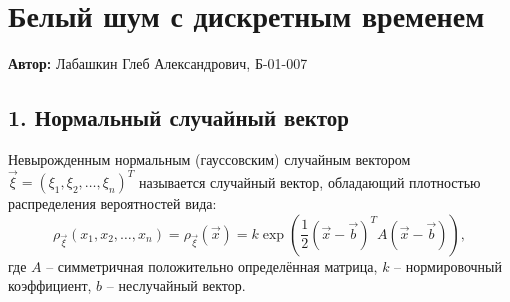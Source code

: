 
\section{Белый шум с дискретным временем}	

\textbf{Автор:} Лабашкин Глеб Александрович, Б-01-007

\subsection*{1. Нормальный случайный вектор} 

\begin{definition} Невырожденным нормальным (гауссовским) случайным вектором  $\vec{\xi} = (\xi_1, \xi_2, \dots, \xi_n)^T$
называется случайный вектор, обладающий плотностью распределения вероятностей вида:
$$\rho_{\vec{\xi}}(x_1, x_2, \dots, x_n) = \rho_{\vec{\xi}}(\vec{x}) = 
k \exp(\displaystyle\frac{1}{2}(\vec{x} - \vec{b})^T A (\vec{x} - \vec{b})),$$
где $A$ -- симметричная положительно определённая матрица,
$k$ -- нормировочный коэффициент, $b$ -- неслучайный вектор. \cite{GasnikovLectionsRP} 
\end{definition}

